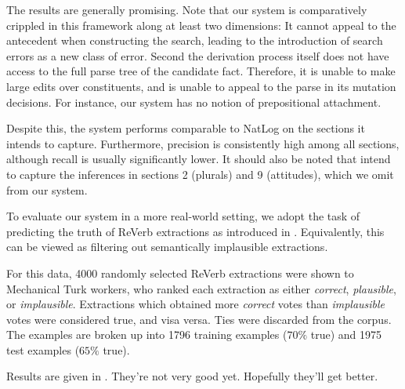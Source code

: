 The results are generally promising.
Note that our system is comparatively crippled in this framework
  along at least two dimensions:
It cannot appeal to the antecedent when constructing the search,
  leading to the introduction of search errors as a new class of
  error.
Second the derivation process itself does not have access to the
  full parse tree of the candidate fact.
Therefore, it is unable to make large edits over constituents,
  and is unable to appeal to the parse in its mutation decisions.
For instance, our system has no notion of prepositional attachment.

Despite this, the system performs comparable to NatLog on the sections
  it intends to capture.
Furthermore, precision is consistently high among all sections, although
  recall is usually significantly lower.
It should also be noted that  
  intend to capture the inferences in sections 2 (plurals)
  and 9 (attitudes), which we omit from our system.

%
%

To evaluate our system in a more real-world setting, we adopt the
  task of predicting the truth of ReVerb extractions
  as introduced in .
Equivalently, this can be viewed as filtering out semantically 
  implausible extractions.

For this data, 4000 randomly selected ReVerb extractions were shown to
  Mechanical Turk workers, who ranked each extraction as either
  \textit{correct}, \textit{plausible}, or \textit{implausible}.
Extractions which obtained more \textit{correct} votes than
  \textit{implausible} votes were considered true, and visa versa.
Ties were discarded from the corpus.
The examples are broken up into 1796 training examples ($70\%$ true)
  and 1975 test examples ($65\%$ true).

Results are given in .
They're not very good yet.
Hopefully they'll get better.
